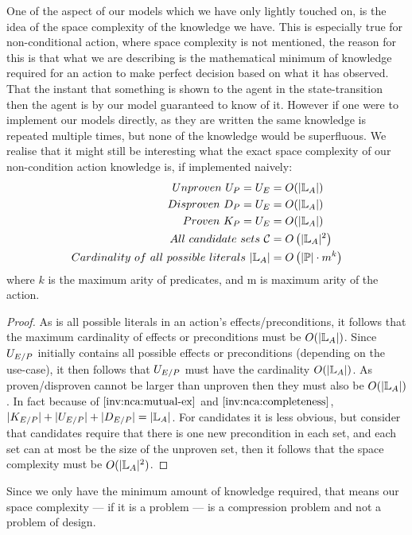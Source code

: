 \documentclass[../Master.tex]{subfiles}
\begin{document}
One of the aspect of our models which we have only lightly touched on, is the idea of the space complexity of the knowledge we have.
This is especially true for non-conditional action, where space complexity is not mentioned, 
the reason for this is that what we are describing is the mathematical minimum of knowledge required for an action to make perfect decision based on what it has observed.
That the instant that something is shown to the agent in the state-transition then the agent is by our model guaranteed to know of it.
However if one were to implement our models directly, as they are written the same knowledge is repeated multiple times, but none of the knowledge would be superfluous.
We realise that it might still be interesting what the exact space complexity of our non-condition action knowledge is, if implemented naively:
 \begin{align*}
 	Unproven ~U_P = U_E & = O(|\mathbb{L}_A|) \\
 	Disproven~D_P = U_E & = O(|\mathbb{L}_A|) \\
 	Proven~K_P = U_E &= O(|\mathbb{L}_A|) \\
 	All ~ candidate~sets~ \mathcal{C} & = O\left(|\mathbb{L}_A|^2\right) \\
    Cardinality~ of ~all~ possible~ literals  ~ |\mathbb{L}_A| & = O \left( |\mathbb{P}| \cdot m ^k \right) \\
 \end{align*} 
 where $k$ is the maximum arity of predicates, and m is maximum arity of the action.
 \begin{proof} 
 	As \litsa is all possible literals in an action's effects/preconditions,
 	it follows that the maximum cardinality of effects or preconditions must be $O(|\mathbb{L}_A|)$.
Since $U_{E/P}$ initially contains all possible effects or preconditions (depending on the use-case), 
	it then follows that $U_{E/P}$ must have the cardinality $O(|\mathbb{L}_A|)$. 
	As proven/disproven cannot be larger than unproven then they must also be $O(|\mathbb{L}_A|)$.
	In fact because of $\Cref{inv:nca:mutual-ex}$ and $\Cref{inv:nca:completeness}$, $|K_{E/P}|+|U_{E/P}|+|D_{E/P}| = |\mathbb{L}_A|$.
	For candidates it is less obvious, but consider that candidates require that there is one new precondition in
	each set, and each set can at most be the size of the unproven set, then it follows that the space complexity must be $O(|\mathbb{L}_A|^2)$.
 \end{proof}
Since we only have the minimum amount of knowledge required, that means our space complexity --- if it is a problem --- is a compression problem and not a problem of design. 
\end{document}

